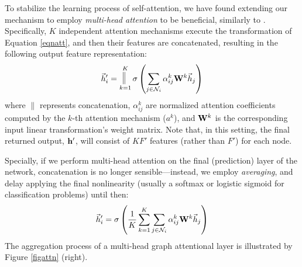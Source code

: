 \documentclass{article} %
\DeclareMathOperator*{\concat}{\scalebox{1}[1.5]{$\parallel$}}
\begin{document}
To stabilize the learning process of self-attention, we have found extending our mechanism to employ \emph{multi-head attention} to be beneficial, similarly to \cite{vaswani2017attention}. Specifically, $K$ independent attention mechanisms execute the transformation of Equation \ref{eqnatt}, and then their features are concatenated, resulting in the following output feature representation:
\begin{equation}
	\vec{h}'_i = \concat_{k=1}^K \sigma\left(\sum_{j\in\mathcal{N}_i}\alpha_{ij}^k{\bf W}^k\vec{h}_j\right)
\end{equation}
where $\parallel$ represents concatenation, $\alpha_{ij}^k$ are normalized attention coefficients computed by the $k$-th attention mechanism ($a^k$), and ${\bf W}^k$ is the corresponding input linear transformation's weight matrix. Note that, in this setting, the final returned output, ${\bf h}'$, will consist of $KF'$ features (rather than $F'$) for each node.

Specially, if we perform multi-head attention on the final (prediction) layer of the network, concatenation is no longer sensible---instead, we employ \emph{averaging}, and delay applying the final nonlinearity (usually a softmax or logistic sigmoid for classification problems) until then:
\begin{equation}
	\vec{h}'_i =  \sigma\left(\frac{1}{K}\sum_{k=1}^K \sum_{j\in\mathcal{N}_i}\alpha_{ij}^k{\bf W}^k\vec{h}_j\right)
\end{equation}
The aggregation process of a multi-head graph attentional layer is illustrated by Figure \ref{figattn} (right).
\end{document}
